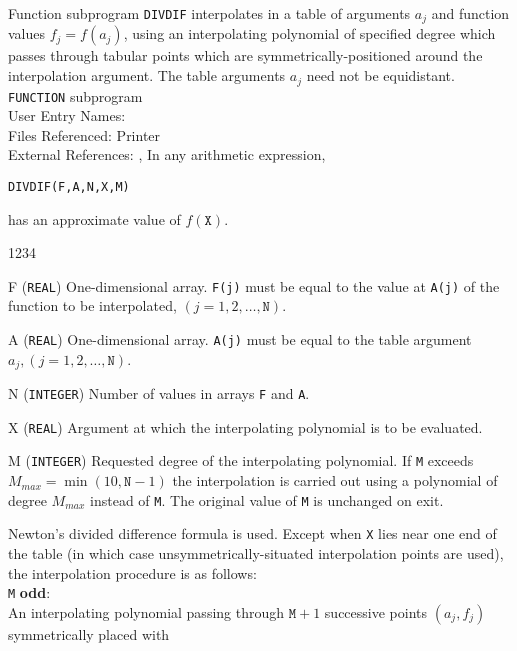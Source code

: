                            
                          
                    
                   
Function subprogram {\tt DIVDIF} interpolates in a table of arguments
$a_j$ and function values $f_j = f(a_j)$, using an interpolating
polynomial of specified degree which passes through tabular points which
are symmetrically-positioned around the interpolation argument. The
table arguments $a_j$ need not be equidistant.
\Structure
{\tt FUNCTION} subprogram \\
User Entry Names: \\
Files Referenced: Printer\\
External References: , 
\Usage
In any arithmetic expression,
\begin{center}
{\tt DIVDIF(F,A,N,X,M)}
\end{center}
has an approximate value of $f(\mathtt{X})$.
\begin{DLtt}{1234}
\item [F]({\tt REAL}) One-dimensional array. {\tt F(j)} must be
equal to the value at {\tt A(j)} of the function to be interpolated,
$(j=1,2,\ldots,\mathtt{N})$.
\item [A]({\tt REAL}) One-dimensional array. {\tt A(j)} must be
equal to the table argument $a_j,(j=1,2,\ldots,\mathtt{N})$.
\item [N]({\tt INTEGER}) Number of values in arrays {\tt F} and {\tt A}.
\item [X]({\tt REAL}) Argument at which the interpolating
polynomial is to be evaluated.
\item [M]({\tt INTEGER}) Requested degree of the interpolating
polynomial. If {\tt M} exceeds $M_{max}=\min(10,\mathtt{N}-1)$ the
interpolation is carried out using a polynomial of degree $M_{max}$
instead of {\tt M}. The original value of {\tt M} is unchanged on exit.
\end{DLtt}
\Method
Newton's divided difference formula is used.
Except when {\tt X} lies near one end of the table (in which
case unsymmetrically-situated interpolation points are used),
the interpolation procedure is as follows: \\
 {\tt M} {\bf odd}: \\
 An interpolating polynomial passing through
$\mathtt{M}+1$ successive points $(a_j,f_j)$ symmetrically placed with

